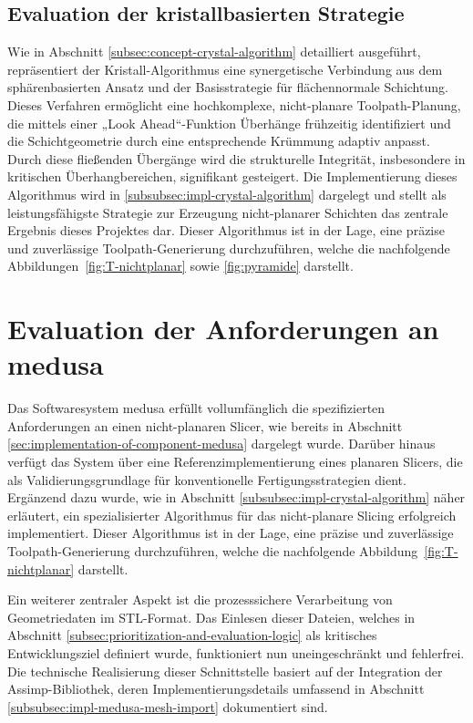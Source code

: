     \subsection{Evaluation der kristallbasierten Strategie}\label{subsec:evaluation-of-crystal-slicer}
      Wie in Abschnitt \ref{subsec:concept-crystal-algorithm} detailliert ausgeführt, repräsentiert der Kristall-Algorithmus eine synergetische Verbindung aus dem sphärenbasierten Ansatz und der Basisstrategie für flächennormale Schichtung.
      Dieses Verfahren ermöglicht eine hochkomplexe, nicht-planare Toolpath-Planung, die mittels einer „Look Ahead“-Funktion Überhänge frühzeitig identifiziert und die Schichtgeometrie durch eine entsprechende Krümmung adaptiv anpasst.
      Durch diese fließenden Übergänge wird die strukturelle Integrität, insbesondere in kritischen Überhangbereichen, signifikant gesteigert.
      Die Implementierung dieses Algorithmus wird in \ref{subsubsec:impl-crystal-algorithm} dargelegt und stellt als leistungsfähigste Strategie zur Erzeugung nicht-planarer Schichten das zentrale Ergebnis dieses Projektes dar.
      Dieser Algorithmus ist in der Lage, eine präzise und zuverlässige Toolpath-Generierung durchzuführen, welche die nachfolgende Abbildungen~\ref{fig:T-nichtplanar} sowie \ref{fig:pyramide} darstellt.

  \section{Evaluation der Anforderungen an \acs{medusa}} \label{sec:evaluation-of-medusa-requirements}
    Das Softwaresystem \ac{medusa} erfüllt vollumfänglich die spezifizierten Anforderungen an einen nicht-planaren Slicer, wie bereits in Abschnitt \ref{sec:implementation-of-component-medusa} dargelegt wurde.
    Darüber hinaus verfügt das System über eine Referenzimplementierung eines planaren Slicers, die als Validierungsgrundlage für konventionelle Fertigungsstrategien dient.
    Ergänzend dazu wurde, wie in Abschnitt \ref{subsubsec:impl-crystal-algorithm} näher erläutert, ein spezialisierter Algorithmus für das nicht-planare Slicing erfolgreich implementiert.
    Dieser Algorithmus ist in der Lage, eine präzise und zuverlässige Toolpath-Generierung durchzuführen, welche die nachfolgende Abbildung~\ref{fig:T-nichtplanar} darstellt.

    Ein weiterer zentraler Aspekt ist die prozesssichere Verarbeitung von Geometriedaten im \ac{STL}-Format.
    Das Einlesen dieser Dateien, welches in Abschnitt \ref{subsec:prioritization-and-evaluation-logic} als kritisches Entwicklungsziel definiert wurde, funktioniert nun uneingeschränkt und fehlerfrei.
    Die technische Realisierung dieser Schnittstelle basiert auf der Integration der Assimp-Bibliothek, deren Implementierungsdetails umfassend in Abschnitt \ref{subsubsec:impl-medusa-mesh-import} dokumentiert sind.

